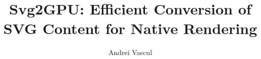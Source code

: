 \documentclass[12pt]{report}
\begin{document}
\title{Svg2GPU: Efficient Conversion of SVG Content for Native Rendering}
\author{Andrei Vascul}

\maketitle

\newpage
\thispagestyle{empty}
\mbox{}
\newpage
{}

\tableofcontents
\listoftables
\listoffigures

\newpage
{}










\end{document}
